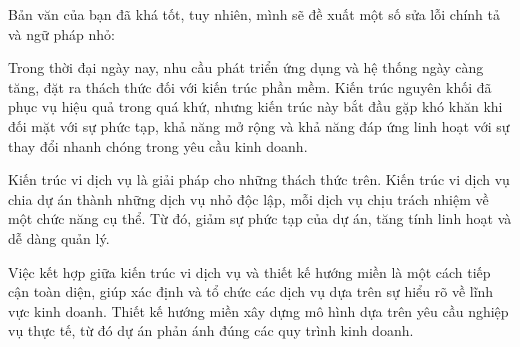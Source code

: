Bản văn của bạn đã khá tốt, tuy nhiên, mình sẽ đề xuất một số sửa lỗi chính tả và ngữ pháp nhỏ:

Trong thời đại ngày nay, nhu cầu phát triển ứng dụng và hệ thống ngày càng tăng, đặt ra thách thức đối với kiến trúc phần mềm. Kiến trúc nguyên khối đã phục vụ hiệu quả trong quá khứ, nhưng kiến trúc này bắt đầu gặp khó khăn khi đối mặt với sự phức tạp, khả năng mở rộng và khả năng đáp ứng linh hoạt với sự thay đổi nhanh chóng trong yêu cầu kinh doanh.

Kiến trúc vi dịch vụ là giải pháp cho những thách thức trên. Kiến trúc vi dịch vụ chia dự án thành những dịch vụ nhỏ độc lập, mỗi dịch vụ chịu trách nhiệm về một chức năng cụ thể. Từ đó, giảm sự phức tạp của dự án, tăng tính linh hoạt và dễ dàng quản lý.

Việc kết hợp giữa kiến trúc vi dịch vụ và thiết kế hướng miền là một cách tiếp cận toàn diện, giúp xác định và tổ chức các dịch vụ dựa trên sự hiểu rõ về lĩnh vực kinh doanh. Thiết kế hướng miền xây dựng mô hình dựa trên yêu cầu nghiệp vụ thực tế, từ đó dự án phản ánh đúng các quy trình kinh doanh.